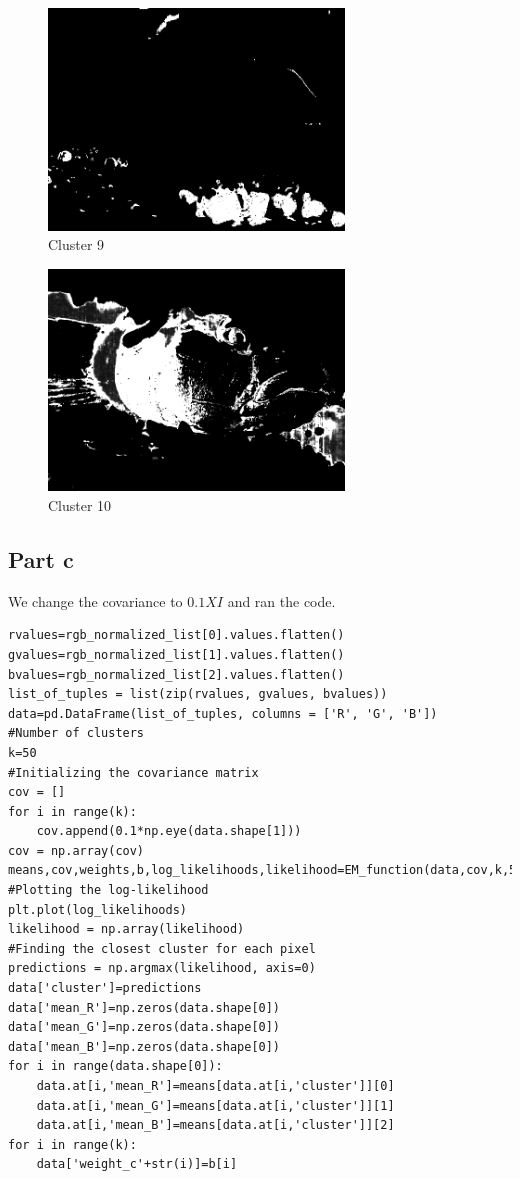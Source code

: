 \documentclass{article}      %
\begin{document}
\begin{figure}[H]
\centering
\includegraphics[width=0.7\textwidth]{partb_wts_cluster8}
\caption{Cluster 9}
\end{figure}

\begin{figure}[H]
\centering
\includegraphics[width=0.7\textwidth]{partb_wts_cluster9}
\caption{Cluster 10}
\end{figure}

\subsection{Part c}

We change the covariance to \(0.1 X I\) and ran the code. 

\begin{lstlisting}
rvalues=rgb_normalized_list[0].values.flatten()
gvalues=rgb_normalized_list[1].values.flatten()
bvalues=rgb_normalized_list[2].values.flatten()
list_of_tuples = list(zip(rvalues, gvalues, bvalues))  
data=pd.DataFrame(list_of_tuples, columns = ['R', 'G', 'B'])
#Number of clusters
k=50
#Initializing the covariance matrix
cov = []
for i in range(k):
    cov.append(0.1*np.eye(data.shape[1]))
cov = np.array(cov)
means,cov,weights,b,log_likelihoods,likelihood=EM_function(data,cov,k,500)
#Plotting the log-likelihood
plt.plot(log_likelihoods)
likelihood = np.array(likelihood)
#Finding the closest cluster for each pixel
predictions = np.argmax(likelihood, axis=0)
data['cluster']=predictions
data['mean_R']=np.zeros(data.shape[0])
data['mean_G']=np.zeros(data.shape[0])
data['mean_B']=np.zeros(data.shape[0])
for i in range(data.shape[0]):
    data.at[i,'mean_R']=means[data.at[i,'cluster']][0]
    data.at[i,'mean_G']=means[data.at[i,'cluster']][1]
    data.at[i,'mean_B']=means[data.at[i,'cluster']][2]
for i in range(k):
    data['weight_c'+str(i)]=b[i]
\end{lstlisting}
\end{document}
